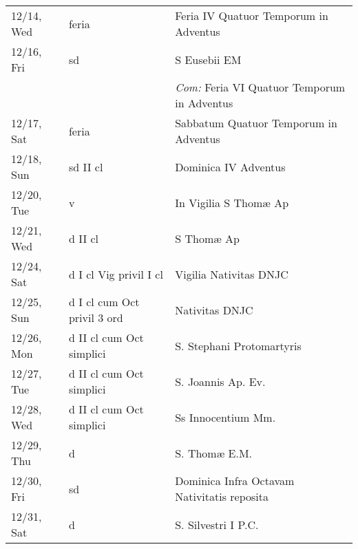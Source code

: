 \documentclass[10pt]{article}
\begin{document}
\begin{longtable}{ l l l }
12/14, Wed & feria & Feria IV Quatuor Temporum in Adventus\\
12/16, Fri & sd & S Eusebii EM\\
 & & \textit{Com:} Feria VI Quatuor Temporum in Adventus\\
12/17, Sat & feria & Sabbatum Quatuor Temporum in Adventus\\
12/18, Sun & sd II cl & Dominica IV Adventus\\
12/20, Tue & v & In Vigilia S Thomæ Ap\\
12/21, Wed & d II cl & S Thomæ Ap\\
12/24, Sat & d I cl Vig privil I cl & Vigilia Nativitas DNJC\\
12/25, Sun & d I cl cum Oct privil 3 ord & Nativitas DNJC\\
12/26, Mon & d II cl cum Oct simplici & S. Stephani Protomartyris\\
12/27, Tue & d II cl cum Oct simplici & S. Joannis Ap. Ev.\\
12/28, Wed & d II cl cum Oct simplici & Ss Innocentium Mm.\\
12/29, Thu & d & S. Thomæ E.M.\\
12/30, Fri & sd & Dominica Infra Octavam Nativitatis reposita\\
12/31, Sat & d & S. Silvestri I P.C.\\
\end{longtable}
\end{document}
